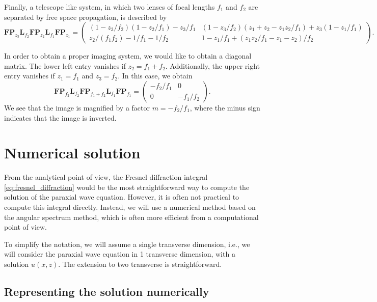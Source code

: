 \documentclass[a4paper,10pt]{report}
\begin{document}
Finally, a telescope like system, in which two lenses of focal lengths $f_1$ and $f_2$ are separated by free space propagation, is described by
\begin{equation}
    \mathbf{FP}_{z_3} \mathbf{L}_{f_2} \mathbf{FP}_{z_2} \mathbf{L}_{f_1} \mathbf{FP}_{z_1} = \begin{pmatrix}
        (1-z_3/f_2)(1-z_2/f_1) - z_3 / f_1 & (1 - z_3 / f_2)(z_1 + z_2 - z_1 z_2 / f_1) + z_3 (1 - z_1 / f_1) \\
        z_2 / (f_1 f_2) - 1/f_1 - 1/f_2 & 1 - z_1 / f_1 + (z_1 z_2 / f_1 - z_1 - z_2)/f_2
    \end{pmatrix} .
\end{equation}

In order to obtain a proper imaging system, we would like to obtain a diagonal matrix. The lower left entry vanishes if $z_2 = f_1 + f_2$. Additionally, the upper right entry vanishes if $z_1 = f_1$ and $z_3 = f_2$. In this case, we obtain 
\begin{equation}
    \mathbf{FP}_{f_2} \mathbf{L}_{f_2} \mathbf{FP}_{f_1+f_2} \mathbf{L}_{f_1} \mathbf{FP}_{f_1} = \begin{pmatrix}
        -f_2 / f_1 & 0 \\
        0 & -f_1 / f_2
    \end{pmatrix} .
\end{equation}
We see that the image is magnified by a factor $m = -f_2 / f_1$, where the minus sign indicates that the image is inverted.

\chapter{Numerical solution}

From the analytical point of view, the Fresnel diffraction integral \eqref{eq:fresnel_diffraction} would be the most straightforward way to compute the solution of the paraxial wave equation. However, it is often not practical to compute this integral directly. Instead, we will use a numerical method based on the angular spectrum method, which is often more efficient from a computational point of view.

To simplify the notation, we will assume a single transverse dimension, i.e., we will consider the paraxial wave equation in 1 transverse dimension, with a solution $u(x,z)$. The extension to two transverse  is straightforward.

\section{Representing the solution numerically}
\end{document}
